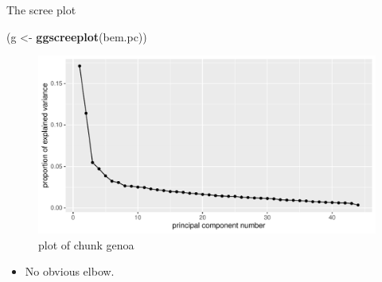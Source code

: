 \documentclass[ignorenonframetext,]{beamer}
\newenvironment{Shaded}{\begin{snugshade}}{\end{snugshade}}
\newcommand{\KeywordTok}[1]{\textcolor[rgb]{0.13,0.29,0.53}{\textbf{#1}}}
\newcommand{\NormalTok}[1]{#1}
\newcommand{\StringTok}[1]{\textcolor[rgb]{0.31,0.60,0.02}{#1}}
\providecommand{\tightlist}{%
  \setlength{\itemsep}{0pt}\setlength{\parskip}{0pt}}
\begin{document}
\begin{frame}[fragile]{The scree plot}
\protect\hypertarget{the-scree-plot}{}

\begin{Shaded}
\begin{Highlighting}[]
\NormalTok{(g <-}\StringTok{ }\KeywordTok{ggscreeplot}\NormalTok{(bem.pc))}
\end{Highlighting}
\end{Shaded}

\begin{figure}
\centering
\includegraphics{figure/genoa-1.pdf}
\caption{plot of chunk genoa}
\end{figure}

\begin{itemize}
\tightlist
\item
  No obvious elbow.
\end{itemize}

\end{frame}
\end{document}
